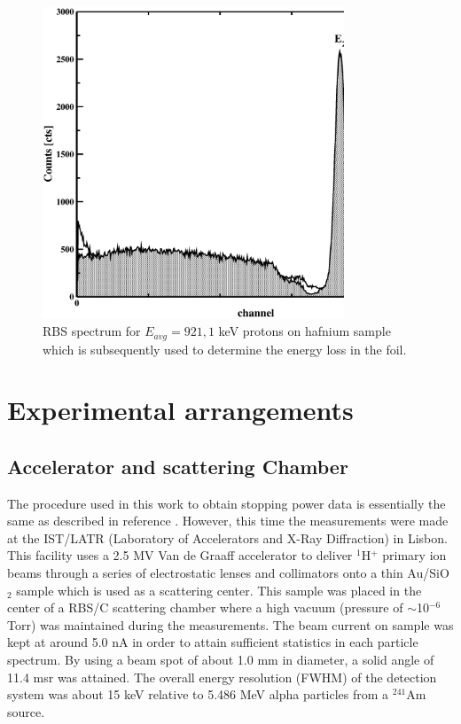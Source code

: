 \documentclass[aps,prb,reprint,groupedaddress]{revtex4-1}
\begin{document}
\begin{figure}[!t]
\centering
\includegraphics[width=9cm]{Fig01.eps}
\caption{RBS spectrum for $E_{avg} = 921,1$ keV protons on hafnium sample which is subsequently used to determine the energy loss in the foil.}
\label{F01}
\end{figure}


\section{Experimental arrangements}
\label{experiment}
\subsection{Accelerator and scattering Chamber}
The procedure used in this work to obtain stopping power data is essentially the same as described in reference \cite{Miranda01}. However, this time the measurements were made at the IST/LATR
(Laboratory of Accelerators and X-Ray Diffraction) in Lisbon. This facility uses a 2.5 MV Van de Graaff accelerator to deliver $^1$H$^+$ primary ion beams through a series of electrostatic lenses and collimators onto a thin Au/SiO$_2$ sample which is used as a scattering center. This sample was placed in the center of a RBS/C scattering chamber where a high vacuum (pressure of
$\sim$10$^{-6}$ Torr) was maintained during the measurements. The beam current on sample was kept at around 5.0 nA in order to attain sufficient statistics in each particle spectrum.
By using a beam spot of about 1.0 mm in diameter, a solid angle of 11.4 msr was attained. The overall energy resolution (FWHM) of the detection system was about 15 keV relative to 5.486 MeV alpha particles from a $^{241}$Am source.
\end{document}
